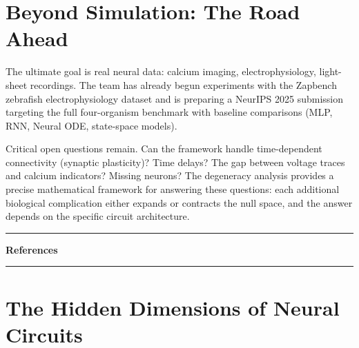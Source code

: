 \documentclass[11pt,twocolumn]{article}
\begin{document}
\section{Beyond Simulation: The Road Ahead}

The ultimate goal is real neural data: calcium imaging, electrophysiology, light-sheet recordings. The team has already begun experiments with the Zapbench zebrafish electrophysiology dataset and is preparing a NeurIPS 2025 submission targeting the full four-organism benchmark with baseline comparisons (MLP, RNN, Neural ODE, state-space models).

Critical open questions remain. Can the framework handle time-dependent connectivity (synaptic plasticity)? Time delays? The gap between voltage traces and calcium indicators? Missing neurons? The degeneracy analysis provides a precise mathematical framework for answering these questions: each additional biological complication either expands or contracts the null space, and the answer depends on the specific circuit architecture.

\vspace{0.4cm}
\noindent\rule{\columnwidth}{0.6pt}

\noindent\textbf{References}


\vspace{0.6cm}
\noindent\rule{\columnwidth}{0.6pt}

\section*{\color{quantablue}The Hidden Dimensions of Neural Circuits}
\end{document}
